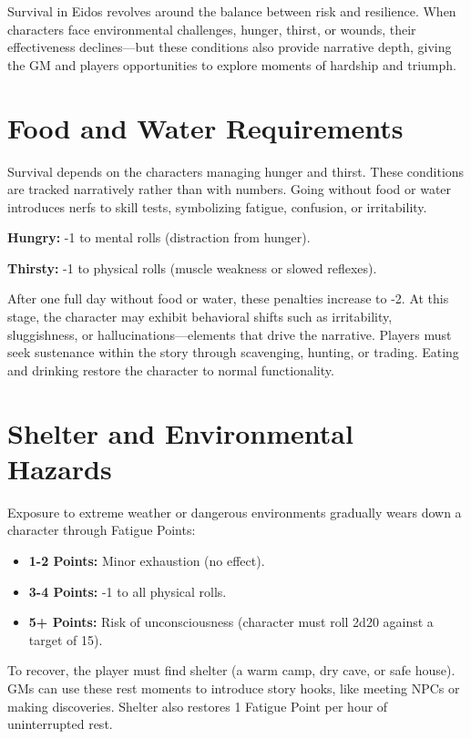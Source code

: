 \documentclass[12pt]{book}  %
\begin{document}
Survival in Eidos revolves around the balance between risk and resilience. When characters face environmental challenges, hunger, thirst, or wounds, their effectiveness declines—but these conditions also provide narrative depth, giving the GM and players opportunities to explore moments of hardship and triumph.

\section{Food and Water Requirements}

Survival depends on the characters managing hunger and thirst. These conditions are tracked narratively rather than with numbers. Going without food or water introduces nerfs to skill tests, symbolizing fatigue, confusion, or irritability.

\textbf{Hungry:} -1 to mental rolls (distraction from hunger).

\textbf{Thirsty:} -1 to physical rolls (muscle weakness or slowed reflexes).

After one full day without food or water, these penalties increase to -2. At this stage, the character may exhibit behavioral shifts such as irritability, sluggishness, or hallucinations—elements that drive the narrative. Players must seek sustenance within the story through scavenging, hunting, or trading. Eating and drinking restore the character to normal functionality.

\section{Shelter and Environmental Hazards}

Exposure to extreme weather or dangerous environments gradually wears down a character through Fatigue Points:

\begin{itemize}
    \item \textbf{1-2 Points:} Minor exhaustion (no effect).
    \item \textbf{3-4 Points:} -1 to all physical rolls.
    \item \textbf{5+ Points:} Risk of unconsciousness (character must roll 2d20 against a target of 15).
\end{itemize}

To recover, the player must find shelter (a warm camp, dry cave, or safe house). GMs can use these rest moments to introduce story hooks, like meeting NPCs or making discoveries. Shelter also restores 1 Fatigue Point per hour of uninterrupted rest.
\end{document}
